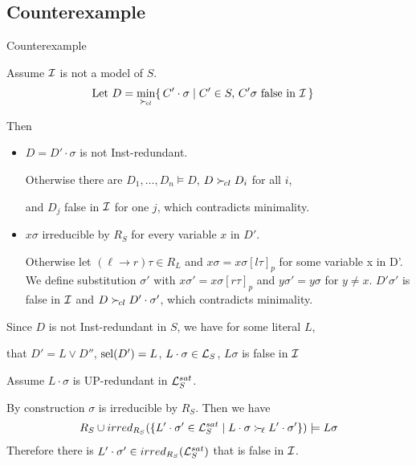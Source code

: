 \documentclass[%
handout,
]{beamer}
\begin{document}
\subsection{Counterexample}
\begin{frame}[allowframebreaks]{Counterexample}

    Assume $\mathcal{I}$ is not a model of $S$.
    \begin{align*}
        \text{Let }
        D &= \min_{\mathrel\succ_{\!cl}}\{\,
        C'\cdot\sigma \mid C'\in S,\,
        C'\sigma\text{ false in }\mathcal{I}\,
        \}
    \end{align*}

    Then
    \begin{itemize}
        \item $D = D'\cdot\sigma$ is not Inst-redundant.
        \vspace{0.2em}

        Otherwise there are
        $D_1,\ldots,D_n\models D$, $D\mathrel\succ_{\!cl} D_i$ for all $i$,

        and $D_j$ false in $\mathcal{I}$ for one $j$, which contradicts minimality.

        \item $x\sigma$ irreducible by $R_S$ for every variable $x$ in $D'$.
        \vspace{0.2em}

        Otherwise let $(\ell\to r)\tau\in R_L$ and $x\sigma = x\sigma[l\tau]_p$ for some variable x in D'.
        We define substitution $\sigma'$ with $x\sigma' = x\sigma[r\tau]_p$ and $y\sigma' = y\sigma$ for $y\neq x$.
        $D'\sigma'$ is false in $\mathcal{I}$ and $D\mathrel\succ_{\!cl} D'\cdot\sigma'$,
        which contradicts minimality.
    \end{itemize}

\framebreak

    Since $D$ is not Inst-redundant in $S$,
    we have for some literal $L$,

    that $D' = L\lor D''$, $\operatorname{sel}(D') = L$, $L\cdot\sigma\in\mathcal{L}_S$,
    $L\sigma$ is false in $\mathcal{I}$

    \vspace{0.7em}
    Assume $L\cdot\sigma$ is UP-redundant in $\mathcal{L}_S^{sat}$.

    \vspace{0.7em}
    By construction $\sigma$ is irreducible by $R_S$. Then we have
    \begin{align*}
        R_S \cup irred_{R_S}(
            \{
            L'\cdot\sigma'\in\mathcal{L}_S^{sat}
            \mid
            L\cdot\sigma \mathrel\succ_{\!\ell} L'\cdot\sigma'
            \}
        )
        \models
        L\sigma
    \end{align*}
    Therefore there is $L'\cdot\sigma'\in irred_{R_S}(\mathcal{L}_S^{sat})$ that is false in $\mathcal{I}$.
    \vspace{0.7em}


\end{frame}
\end{document}

